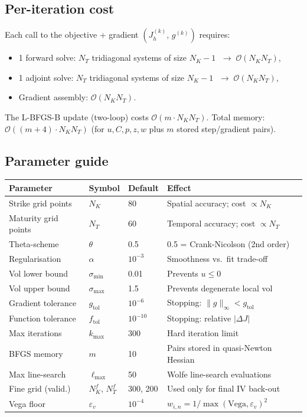 \documentclass[11pt, a4paper]{article}
\theoremstyle{definition}
\theoremstyle{plain}
\begin{document}
\subsection{Per-iteration cost}

Each call to the objective + gradient $(J_h^{(k)},\, g^{(k)})$ requires:
\begin{itemize}
  \item 1 forward solve: $N_T$ tridiagonal systems of size $N_K - 1$
        $\;\to\; \mathcal{O}(N_K N_T)$,
  \item 1 adjoint solve: $N_T$ tridiagonal systems of size $N_K - 1$
        $\;\to\; \mathcal{O}(N_K N_T)$,
  \item Gradient assembly: $\mathcal{O}(N_K N_T)$.
\end{itemize}
The L-BFGS-B update (two-loop) costs $\mathcal{O}(m \cdot N_K N_T)$.
Total memory: $\mathcal{O}((m+4) \cdot N_K N_T)$ (for $u, C, p, z, w$ plus
$m$ stored step/gradient pairs).

\subsection{Parameter guide}
\label{sec:params}

\begin{center}
\begin{tabular}{llll}
\toprule
Parameter & Symbol & Default & Effect \\
\midrule
Strike grid points   & $N_K$ & 80 & Spatial accuracy; cost $\propto N_K$ \\
Maturity grid points & $N_T$ & 60 & Temporal accuracy; cost $\propto N_T$ \\
Theta-scheme         & $\theta$ & 0.5 & 0.5 = Crank-Nicolson (2nd order) \\
Regularisation       & $\alpha$ & $10^{-3}$ & Smoothness vs.\ fit trade-off \\
Vol lower bound      & $\sigma_{\min}$ & 0.01 & Prevents $u \leq 0$ \\
Vol upper bound      & $\sigma_{\max}$ & 1.5 & Prevents degenerate local vol \\
Gradient tolerance   & $g_\text{tol}$ & $10^{-6}$ & Stopping: $\|g\|_\infty < g_\text{tol}$ \\
Function tolerance   & $f_\text{tol}$ & $10^{-10}$ & Stopping: relative $|ΔJ|$ \\
Max iterations       & $k_{\max}$ & 300 & Hard iteration limit \\
BFGS memory          & $m$ & 10 & Pairs stored in quasi-Newton Hessian \\
Max line-search      & $\ell_{\max}$ & 50 & Wolfe line-search evaluations \\
\midrule
Fine grid (valid.)   & $N_K^f$, $N_T^f$ & 300, 200 & Used only for final IV back-out \\
Vega floor           & $\varepsilon_v$ & $10^{-4}$ & $w_{i,n} = 1/\max(\text{Vega}, \varepsilon_v)^2$ \\
\bottomrule
\end{tabular}
\end{center}
\end{document}
